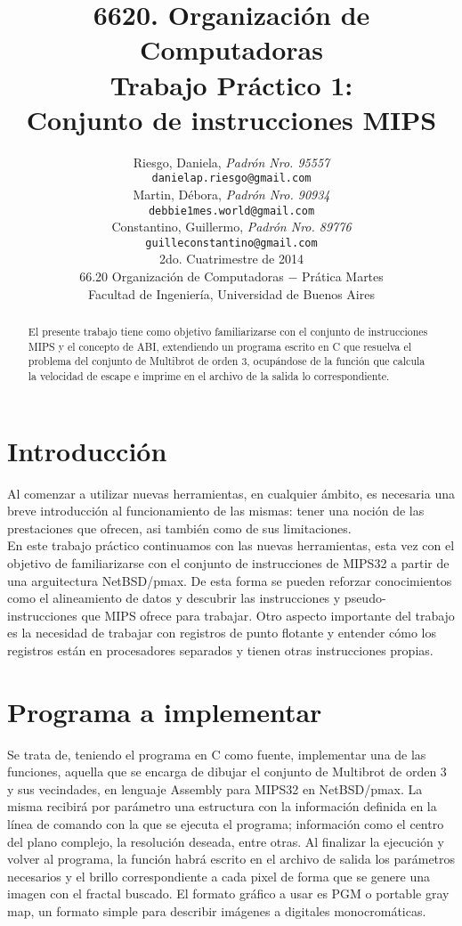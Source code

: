 \documentclass[a4paper,10pt]{article}
\title{ \textbf{ 6620. Organizaci\'on de Computadoras\\
Trabajo Pr\'actico 1: \\
Conjunto de instrucciones MIPS}}
\author{ Riesgo, Daniela, \textit{Padr\'on Nro. 95557} \\
\texttt{ danielap.riesgo@gmail.com } \\[2.5ex]
Martin, D\'ebora, \textit{Padr\'on Nro. 90934} \\
\texttt{ debbie1mes.world@gmail.com } \\[2.5ex]
Constantino, Guillermo, \textit{Padr\'on Nro. 89776} \\
\texttt{ guilleconstantino@gmail.com } \\[2.5ex]
\normalsize{2do. Cuatrimestre de 2014} \\
\normalsize{66.20 Organizaci\'on de Computadoras $-$ Pr\'atica Martes} \\
\normalsize{Facultad de Ingenier\'ia, Universidad de Buenos Aires} \\
}
\date{}
\begin{document}
\maketitle
\thispagestyle{empty} %

\begin{abstract}
El presente trabajo tiene como objetivo familiarizarse con el conjunto de instrucciones MIPS y el concepto de ABI, extendiendo un programa escrito en C que resuelva el problema del conjunto de Multibrot de orden 3, ocupándose de la funci\'on que calcula la velocidad de escape e imprime en el archivo de la salida lo correspondiente.

\end{abstract}

\cleardoublepage
\setcounter{page}{0}
\newpage
\tableofcontents
\newpage


\section{Introducci\'on}
Al comenzar a utilizar nuevas herramientas, en cualquier \'ambito, es necesaria una breve introducci\'on al funcionamiento de las mismas: tener una noci\'on de las prestaciones que ofrecen, asi tambi\'en como de sus limitaciones.\\
En este trabajo pr\'actico continuamos con las nuevas herramientas, esta vez con el objetivo de 
familiarizarse con el conjunto de instrucciones de MIPS32 a partir de una arguitectura NetBSD/pmax.
De esta forma se pueden reforzar conocimientos como el alineamiento de datos y descubrir las 
instrucciones y pseudo-instrucciones que MIPS ofrece para trabajar.
Otro aspecto importante del trabajo es la necesidad de trabajar con registros de punto flotante y 
entender c\'omo los registros est\'an en procesadores separados y tienen otras instrucciones propias.




\section{Programa a implementar}
Se trata de, teniendo el programa en C como fuente, implementar una de las funciones, aquella que se encarga 
de dibujar el conjunto de Multibrot de orden 3 y sus vecindades, en lenguaje Assembly para MIPS32 
en NetBSD/pmax.
La misma recibir\'a por par\'ametro una estructura con la informaci\'on definida en la l\'inea de 
comando con la que se ejecuta el programa; información como el centro del plano complejo, la resoluci\'on deseada, entre otras.
Al finalizar la ejecuci\'on y volver al programa, la funci\'on habr\'a escrito en el archivo de salida 
los par\'ametros necesarios y el brillo correspondiente a cada pixel de forma que se genere una imagen con el fractal buscado.
El formato gr\'afico a usar es PGM o portable gray map, un formato simple para describir im\'agenes a
digitales monocrom\'aticas.
\end{document}
